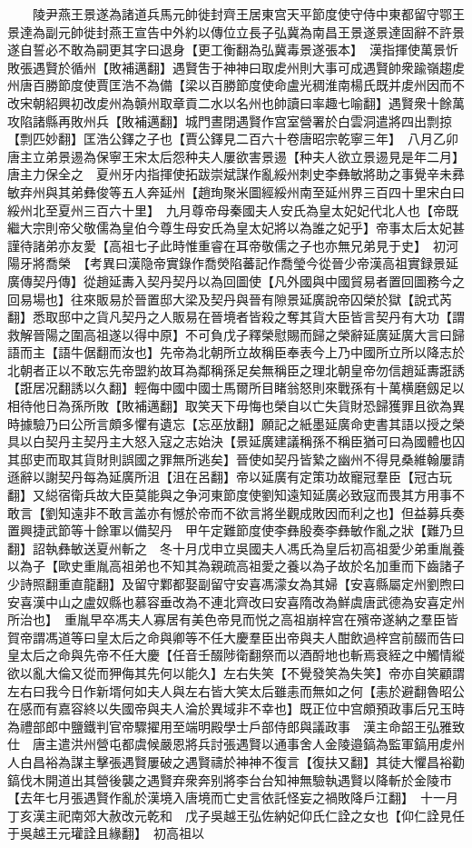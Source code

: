 　　陵尹燕王景遂為諸道兵馬元帥徙封齊王居東宫天平節度使守侍中東都留守鄂王景達為副元帥徙封燕王宣告中外約以傳位立長子弘冀為南昌王景遂景達固辭不許景遂自誓必不敢為嗣更其字曰退身【更工衡翻為弘冀毒景遂張本】　漢指揮使萬景忻敗張遇賢於循州【敗補邁翻】遇賢吿于神神曰取䖍州則大事可成遇賢帥衆踰嶺趨䖍州唐百勝節度使賈匡浩不為備【梁以百勝節度使命盧光稠淮南楊氏既并䖍州因而不改宋朝紹興初改䖍州為贑州取章貢二水以名州也帥讀曰率趣七喻翻】遇賢衆十餘萬攻陷諸縣再敗州兵【敗補邁翻】城門晝閉遇賢作宫室營署於白雲洞遣將四出剽掠【剽匹妙翻】匡浩公鐸之子也【賈公鐸見二百六十卷唐昭宗乾寧三年】　八月乙卯唐主立弟景逷為保寧王宋太后怨种夫人屢欲害景逷【种夫人欲立景逷見是年二月】唐主力保全之　夏州牙内指揮使拓跋崇斌謀作亂綏州刺史李彝敏將助之事覺辛未彞敏弃州與其弟彝俊等五人奔延州【趙珣聚米圖經綏州南至延州界三百四十里宋白曰綏州北至夏州三百六十里】　九月尊帝母秦國夫人安氏為皇太妃妃代北人也【帝既繼大宗則帝父敬儒為皇伯今尊生母安氏為皇太妃將以為誰之妃乎】帝事太后太妃甚謹待諸弟亦友愛【高祖七子此時惟重睿在耳帝敬儒之子也亦無兄弟見于史】　初河陽牙將喬榮　【考異曰漢隐帝實錄作喬熒陷蕃記作喬瑩今從晉少帝漢高祖實録景延廣傳契丹傳】從趙延夀入契丹契丹以為回圖使【凡外國與中國貿易者置回圖務今之回易場也】往來販易於晉置邸大梁及契丹與晉有隙景延廣說帝囚榮於獄【說式芮翻】悉取邸中之貨凡契丹之人販易在晉境者皆殺之奪其貨大臣皆言契丹有大功【謂救解晉陽之圍高祖遂以得中原】不可負戊子釋榮慰賜而歸之榮辭延廣延廣大言曰歸語而主【語牛倨翻而汝也】先帝為北朝所立故稱臣奉表今上乃中國所立所以降志於北朝者正以不敢忘先帝盟約故耳為鄰稱孫足矣無稱臣之理北朝皇帝勿信趙延夀誑誘【誑居况翻誘以久翻】輕侮中國中國士馬爾所目睹翁怒則來戰孫有十萬横磨劔足以相待他日為孫所敗【敗補邁翻】取笑天下毋悔也榮自以亡失貨財恐歸獲罪且欲為異時據驗乃曰公所言頗多懼有遺忘【忘巫放翻】願記之紙墨延廣命吏書其語以授之榮具以白契丹主契丹主大怒入寇之志始決【景延廣建議稱孫不稱臣猶可曰為國體也囚其邸吏而取其貨財則誤國之罪無所逃矣】晉使如契丹皆縶之幽州不得見桑維翰屢請遜辭以謝契丹每為延廣所沮【沮在呂翻】帝以延廣有定策功故寵冠羣臣【冠古玩翻】又縂宿衛兵故大臣莫能與之争河東節度使劉知遠知延廣必致寇而畏其方用事不敢言【劉知遠非不敢言盖亦有憾於帝而不欲言將坐觀成敗因而利之也】但益募兵奏置興捷武節等十餘軍以備契丹　甲午定難節度使李彝殷奏李彝敏作亂之狀【難乃旦翻】詔執彝敏送夏州斬之　冬十月戊申立吳國夫人馮氏為皇后初高祖愛少弟重胤養以為子【歐史重胤高祖弟也不知其為親疏高祖愛之養以為子故於名加重而下齒諸子少詩照翻重直龍翻】及留守鄴都娶副留守安喜馮濛女為其婦【安喜縣屬定州劉煦曰安喜漢中山之盧奴縣也慕容垂改為不連北齊改曰安喜隋改為鮮虞唐武德為安喜定州所治也】　重胤早卒馮夫人寡居有美色帝見而悦之高祖崩梓宫在殯帝遂納之羣臣皆賀帝謂馮道等曰皇太后之命與卿等不任大慶羣臣出帝與夫人酣飲過梓宫前醊而告曰皇太后之命與先帝不任大慶【任音壬醊陟衛翻祭而以酒酹地也斬焉衰絰之中觸情縱欲以亂大倫又從而狎侮其先何以能久】左右失笑【不覺發笑為失笑】帝亦自笑顧謂左右曰我今日作新壻何如夫人與左右皆大笑太后雖恚而無如之何【恚於避翻魯昭公在感而有嘉容終以失國帝與夫人淪於異域非不幸也】既正位中宫頗預政事后兄玉時為禮部郎中鹽鐵判官帝驟擢用至端明殿學士戶部侍郎與議政事　漢主命韶王弘雅致仕　唐主遣洪州營屯都虞候嚴恩將兵討張遇賢以通事舍人金陵邉鎬為監軍鎬用䖍州人白昌裕為謀主擊張遇賢屢破之遇賢禱於神神不復言【復扶又翻】其徒大懼昌裕勸鎬伐木開道出其營後襲之遇賢弃衆奔别將李台台知神無驗執遇賢以降斬於金陵市【去年七月張遇賢作亂於漢境入唐境而亡史言依託怪妄之禍敗降戶江翻】　十一月丁亥漢主祀南郊大赦改元乾和　戊子吳越王弘佐納妃仰氏仁詮之女也【仰仁詮見任于吳越王元瓘詮且緣翻】　初高祖以